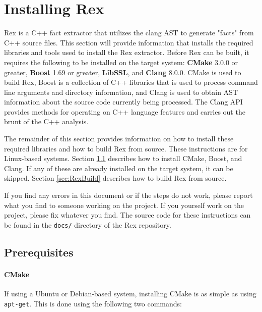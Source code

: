 




\section{Installing Rex}

Rex is a C++ fact extractor that utilizes the clang AST to generate "facts" from
C++ source files. This section will provide information that installs the
required libraries and tools used to install the Rex extractor. Before Rex can
be built, it requires the following to be installed on the target system:
\textbf{CMake} 3.0.0 or greater, \textbf{Boost} 1.69 or greater,
\textbf{LibSSL}, and \textbf{Clang} 8.0.0. CMake is used to build Rex, Boost is
a collection of C++ libraries that is used to process command line arguments and
directory information, and Clang is used to obtain AST information about the
source code currently being processed. The Clang API provides methods for
operating on C++ language features and carries out the brunt of the C++
analysis.

The remainder of this section provides information on how to install these
required libraries and how to build Rex from source. These instructions are for
Linux-based systems. Section \ref{sec:CRPre} describes how to install CMake,
Boost, and Clang. If any of these are already installed on the target system, it
can be skipped. Section \ref{sec:RexBuild} describes how to build Rex from
source.

If you find any errors in this document or if the steps do not work, please
report what you find to someone working on the project. If you yourself work on
the project, please fix whatever you find. The source code for these
instructions can be found in the \texttt{docs/} directory of the Rex repository.

\subsection{Prerequisites}
\label{sec:CRPre}
\paragraph{CMake}

If using a Ubuntu or Debian-based system, installing CMake is as simple as using
\texttt{apt-get}. This is done using the following two commands:

